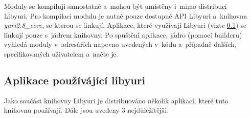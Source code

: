 \documentclass[thesis=M,czech]{FITthesis}[2012/06/26]
\begin{document}
Moduly se kompilují samostatně a~mohou být umístěny i~mimo distribuci Libyuri. Pro kompilaci modulu je nutné pouze dostupné API Libyuri a~knihovna \textit{yuri2.8\_core}, se kterou se linkují. Aplikace, které využívají Libyuri (vizte \ref{subsec:analyza_yuri_aplikace}) se linkují pouze s~jádrem knihovny. Po spuštění aplikace, jádro (pomocí builderu) vyhledá moduly v~adresářích napevno uvedených v~kódu a~případně dalších, specifikovaných uživatelem a~načte je.

\subsection{Aplikace používájící libyuri} \label{subsec:analyza_yuri_aplikace}
Jako součást knihovny Libyuri je distribuováno několik aplikací, které tuto knihovnu používají. Dále jsou uvedeny 3 nejdůležitější.\\
\end{document}
